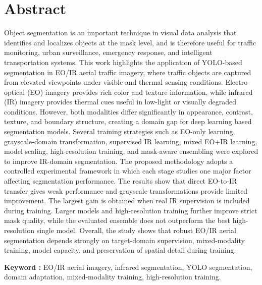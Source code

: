 \chapter*{Abstract}

Object segmentation is an important technique in visual data analysis that identifies and localizes objects at the mask level, and is therefore useful for traffic monitoring, urban surveillance, emergency response, and intelligent transportation systems. This work highlights the application of YOLO-based segmentation in EO/IR aerial traffic imagery, where traffic objects are captured from elevated viewpoints under visible and thermal sensing conditions. Electro-optical (EO) imagery provides rich color and texture information, while infrared (IR) imagery provides thermal cues useful in low-light or visually degraded conditions. However, both modalities differ significantly in appearance, contrast, texture, and boundary structure, creating a domain gap for deep learning based segmentation models. Several training strategies such as EO-only learning, grayscale-domain transformation, supervised IR learning, mixed EO+IR learning, model scaling, high-resolution training, and mask-aware ensembling were explored to improve IR-domain segmentation. The proposed methodology adopts a controlled experimental framework in which each stage studies one major factor affecting segmentation performance. The results show that direct EO-to-IR transfer gives weak performance and grayscale transformations provide limited improvement. The largest gain is obtained when real IR supervision is included during training. Larger models and high-resolution training further improve strict mask quality, while the evaluated ensemble does not outperform the best high-resolution single model. Overall, the study shows that robust EO/IR aerial segmentation depends strongly on target-domain supervision, mixed-modality training, model capacity, and preservation of spatial detail during training.

\vspace{10pt}
\noindent\textbf{Keyword :} EO/IR aerial imagery, infrared segmentation, YOLO segmentation, domain adaptation, mixed-modality training, high-resolution training.
